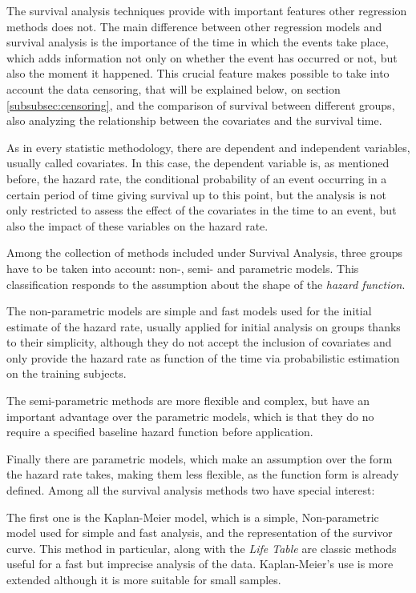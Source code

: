 \documentclass[11pt]{book} %
\begin{document}
    The survival analysis techniques provide with important features other regression methods does not. The main difference between other regression models and survival analysis is the importance of the time in which the events take place, which adds information not only on whether the event has occurred or not, but also the moment it happened. This crucial feature makes possible to take into account the data censoring, that will be explained below, on section \ref{subsubsec:censoring}, and the comparison of survival between different groups, also analyzing the relationship between the covariates and the survival time.

    As in every statistic methodology, there are dependent and independent variables, usually called covariates. In this case, the dependent variable is, as mentioned before, the hazard rate, the conditional probability of an event occurring in a certain period of time giving survival up to this point, but the analysis is not only restricted to assess the effect of the covariates in the time to an event, but also the impact of these variables on the hazard rate.

    Among the collection of methods included under Survival Analysis, three groups have to be taken into account: non-, semi- and parametric models. This classification responds to the assumption about the shape of the \emph{hazard function}.

    The non-parametric models are simple and fast models used for the initial estimate of the hazard rate, usually applied for initial analysis on groups thanks to their simplicity, although they do not accept the inclusion of covariates and only provide the hazard rate as function of the time via probabilistic estimation on the training subjects.

    The semi-parametric methods are more flexible and complex, but have an important advantage over the parametric models, which is that they do no require a specified baseline hazard function before application.

    Finally there are parametric models, which make an assumption over the form the hazard rate takes, making them less flexible, as the function form is already defined. Among all the survival analysis methods two have special interest:

    The first one is the Kaplan-Meier model, which is a simple, Non-parametric model used for simple and fast analysis, and the representation of the survivor curve. This method in particular, along with the \emph{Life Table} are classic methods useful for a fast but imprecise analysis of the data. Kaplan-Meier's use is more extended although it is more suitable for small samples.
\end{document}
